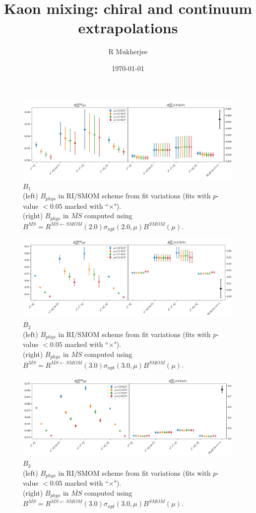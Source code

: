 \documentclass[12pt]{extarticle}
\title{Kaon mixing: chiral and continuum extrapolations}
\author{R Mukherjee}
\date{\today}
\begin{document}
\maketitle
\tableofcontents
\clearpage
\begin{figure}
\centering
\includegraphics[page=1, width=1.1\textwidth]{VVpAA/SUSY/fit_summary.pdf}
\caption{$B_{1}$\\(left) $B_{phys}$ in RI/SMOM scheme from fit variations (fits with $p$-value $<0.05$ marked with ``$\times$"). \\(right) $B_{phys}$ in $\overline{MS}$ computed using $B^{\overline{MS}} = R^{\overline{MS}\leftarrow SMOM}(2.0)\sigma_{npt}(2.0,\mu) B^{SMOM}(\mu)$.}
\end{figure}
\clearpage
\begin{figure}
\centering
\includegraphics[page=1, width=1.1\textwidth]{VVmAA/SUSY/fit_summary.pdf}
\caption{$B_{2}$\\(left) $B_{phys}$ in RI/SMOM scheme from fit variations (fits with $p$-value $<0.05$ marked with ``$\times$"). \\(right) $B_{phys}$ in $\overline{MS}$ computed using $B^{\overline{MS}} = R^{\overline{MS}\leftarrow SMOM}(3.0)\sigma_{npt}(3.0,\mu) B^{SMOM}(\mu)$.}
\end{figure}
\clearpage
\begin{figure}
\centering
\includegraphics[page=1, width=1.1\textwidth]{SSmPP/SUSY/fit_summary.pdf}
\caption{$B_{3}$\\(left) $B_{phys}$ in RI/SMOM scheme from fit variations (fits with $p$-value $<0.05$ marked with ``$\times$"). \\(right) $B_{phys}$ in $\overline{MS}$ computed using $B^{\overline{MS}} = R^{\overline{MS}\leftarrow SMOM}(3.0)\sigma_{npt}(3.0,\mu) B^{SMOM}(\mu)$.}
\end{figure}
\end{document}
